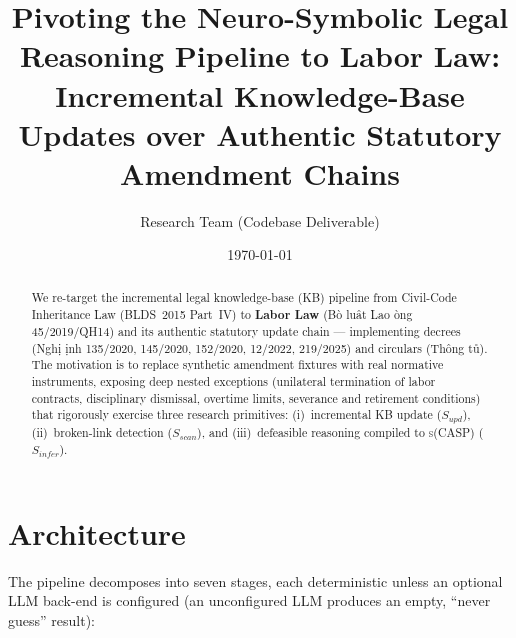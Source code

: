 \documentclass[11pt]{article}
\title{Pivoting the Neuro-Symbolic Legal Reasoning Pipeline to Labor Law:\\[2pt]
       Incremental Knowledge-Base Updates over Authentic Statutory Amendment Chains}
\author{Research Team (Codebase Deliverable)}
\date{\today}
\begin{document}
\maketitle

\begin{abstract}
We re-target the incremental legal knowledge-base (KB) pipeline from Civil-Code
Inheritance Law (BLDS~2015 Part~IV) to \textbf{Labor Law} (B\`o lu\^at Lao \dj\`ong
45/2019/QH14) and its authentic statutory update chain --- implementing decrees
(Ngh\d{i} \dj\d{i}nh 135/2020, 145/2020, 152/2020, 12/2022, 219/2025) and circulars
(Th\^ong t\r u). The motivation is to replace synthetic amendment fixtures with
real normative instruments, exposing deep nested exceptions (unilateral termination of
labor contracts, disciplinary dismissal, overtime limits, severance and retirement
conditions) that rigorously exercise three research primitives: (i)~incremental KB
update ($S_{upd}$), (ii)~broken-link detection ($S_{scan}$), and (iii)~defeasible
reasoning compiled to \textsc{s(CASP)} ($S_{infer}$).
\end{abstract}

\section{Architecture}
The pipeline decomposes into seven stages, each deterministic unless an optional LLM
back-end is configured (an unconfigured LLM produces an empty, ``never guess'' result):
\end{document}
